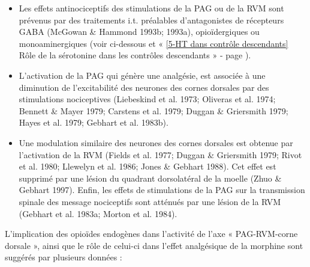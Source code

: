 \documentclass[a4paper,12pt,twoside]{report}
\begin{document}
\begin{itemize}
\item Les effets antinociceptifs des stimulations de la PAG ou de la RVM sont prévenus par des traitements i.t. préalables d’antagonistes de récepteurs GABA (McGowan \& Hammond 1993b; 1993a), opioïdergiques ou monoaminergiques (voir ci-dessous et « \ref{5-HT dans contrôle descendants} Rôle de la sérotonine dans les contrôles descendants » - page \pageref{5-HT dans contrôle descendants}).
\item L’activation de la PAG qui génère une analgésie, est associée à une diminution de l’excitabilité des neurones des cornes dorsales par des stimulations nociceptives (Liebeskind et al. 1973; Oliveras et al. 1974; Bennett \& Mayer 1979; Carstens et al. 1979; Duggan \& Griersmith 1979; Hayes et al. 1979; Gebhart et al. 1983b). 
\item Une modulation similaire des neurones des cornes dorsales est obtenue par l’activation de la RVM (Fields et al. 1977; Duggan \& Griersmith 1979; Rivot et al. 1980; Llewelyn et al. 1986; Jones \& Gebhart 1988). Cet effet est supprimé par une lésion du quadrant dorsolatéral de la moelle (Zhuo \& Gebhart 1997). Enfin, les effets de stimulations de la PAG sur la transmission spinale des message nociceptifs sont atténués par une lésion de la RVM (Gebhart et al. 1983a; Morton et al. 1984). 
\end{itemize}

\bigskip

L’implication des opioïdes endogènes dans l’activité de l’axe « PAG-RVM-corne dorsale », ainsi que le rôle de celui-ci dans l’effet analgésique de la morphine sont suggérés par plusieurs données :
\end{document}
